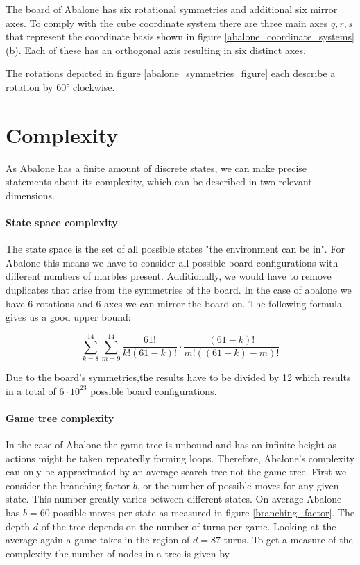 The board of Abalone has six rotational symmetries and additional six mirror axes. To comply with the cube coordinate system there are three main axes $q, r, s$ that represent the coordinate basis shown in figure \ref{abalone_coordinate_systems} (b). Each of these has an orthogonal axis resulting in six distinct axes.

The rotations depicted in figure \ref{abalone_symmetries_figure} each describe a rotation by 60° clockwise.

\section{Complexity}
As Abalone has a finite amount of discrete states, we can make precise statements about its complexity, which can be described in two relevant dimensions.

\paragraph{State space complexity}
\label{state_space_complexity}

The state space is the set of all possible states "the environment can be in".\cite[p. 150]{russell_artificial_2021} For Abalone this means we have to consider all possible board configurations with different numbers of marbles present. Additionally, we would have to remove duplicates that arise from the symmetries of the board. In the case of abalone we have 6 rotations and 6 axes we can mirror the board on. The following formula gives us a good upper bound:

\begin{equation}
    \sum_{k=8}^{14}\sum_{m=9}^{14}\frac{61!}{k!(61-k)!}\cdot\frac{(61-k)!}{m!((61-k)-m)!}
\end{equation}

Due to the board's symmetries,the results have to be divided by 12 which results in a total of $ 6 \cdot 10^{23} $ possible board configurations. \cite[p. 4]{lemmens_constructing_2005}

\paragraph{Game tree complexity} In the case of Abalone the game tree is unbound and has an infinite height as actions might be taken repeatedly forming loops. Therefore, Abalone's complexity can only be approximated by an average search tree not the game tree. First we consider the branching factor $ b $, or the number of possible moves for any given state. This number greatly varies between different states. On average Abalone has $ b = 60 $ possible moves per state as measured in figure \ref{branching_factor}. The depth $ d $ of the tree depends on the number of turns per game. Looking at the average again a game takes in the region of $ d = 87 $ turns. To get a measure of the complexity the number of nodes in a tree is given by

